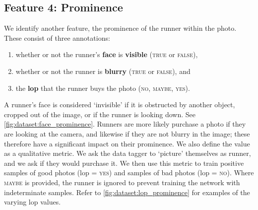 %

\subsection{Feature 4: Prominence}

We identify another feature, the prominence of the runner within the photo. These consist of three annotations:

\begin{enumerate}
  \item whether or not the runner's \textbf{face} is \textbf{visible} (\textsc{true} or \textsc{false}),
  \item whether or not the runner is \textbf{blurry} (\textsc{true} or \textsc{false}), and
  \item the \textbf{\gls{lop}} that the runner buys the photo (\textsc{no}, \textsc{maybe}, \textsc{yes}).
\end{enumerate}

A runner's face is considered `invisible' if it is obstructed by another object, cropped out of the image, or if the runner is looking down. See \cref{fig:dataset:face_prominence}. Runners are more likely purchase a photo if they are looking at the camera, and likewise if they are not blurry in the image; these therefore have a significant impact on their prominence. We also define the  value as a qualitative metric. We ask the data tagger to `picture' themselves as runner, and we ask if they would purchase it. We then use this metric to train positive samples of good photos (\gls{lop} = \textsc{yes}) and samples of bad photos (\gls{lop} = \textsc{no}). Where \textsc{maybe} is provided, the runner is ignored to prevent training the network with indeterminate samples. Refer to \cref{fig:dataset:lop_prominence} for examples of the varying \gls{lop} values. 

